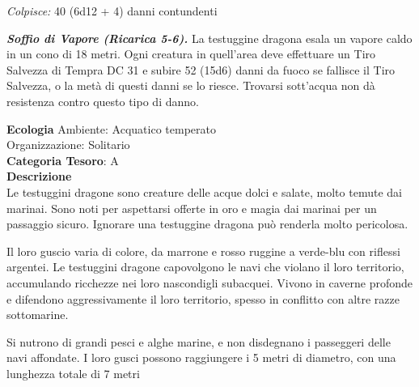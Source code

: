 \begin{multicols}{2}
{\emph{Colpisce:} 40 (6d12 + 4) danni contundenti

\emph{\textbf{Soffio di Vapore (Ricarica 5-6).}} La testuggine dragona esala un vapore caldo in un cono di 18 metri. Ogni creatura in quell'area deve effettuare un Tiro Salvezza di Tempra DC 31 e subire 52 (15d6) danni da fuoco se fallisce il Tiro Salvezza, o la metà di questi danni se lo riesce. Trovarsi sott'acqua non dà resistenza contro questo tipo di danno.

\textbf{Ecologia}
Ambiente: Acquatico temperato\\
Organizzazione: Solitario\\
\textbf{Categoria Tesoro}: A\\
\textbf{Descrizione}\\
Le testuggini dragone sono creature delle acque dolci e salate, molto temute dai marinai. Sono noti per aspettarsi offerte in oro e magia dai marinai per un passaggio sicuro. Ignorare una testuggine dragona può renderla molto pericolosa.

Il loro guscio varia di colore, da marrone e rosso ruggine a verde-blu con riflessi argentei. Le testuggini dragone capovolgono le navi che violano il loro territorio, accumulando ricchezze nei loro nascondigli subacquei. Vivono in caverne profonde e difendono aggressivamente il loro territorio, spesso in conflitto con altre razze sottomarine.

Si nutrono di grandi pesci e alghe marine, e non disdegnano i passeggeri delle navi affondate. I loro gusci possono raggiungere i 5 metri di diametro, con una lunghezza totale di 7 metri

}
\end{multicols}

